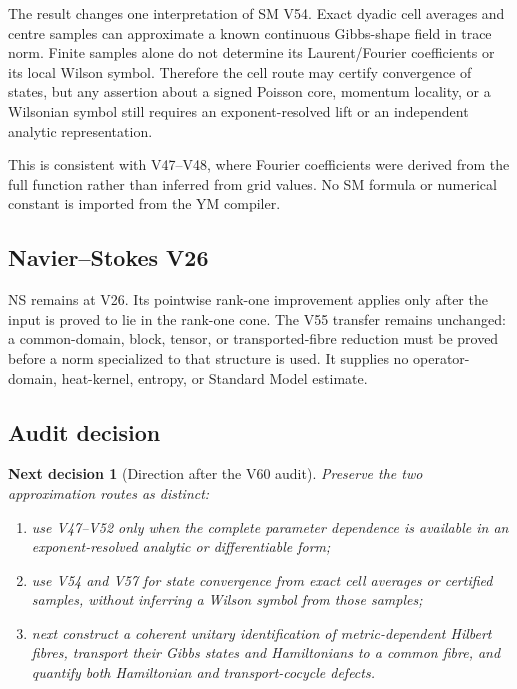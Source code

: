 \documentclass[11pt]{article}
\newtheorem{decision}[theorem]{Next decision}
\theoremstyle{remark}
\begin{document}
The result changes one interpretation of SM V54.  Exact dyadic cell
averages and centre samples can approximate a known continuous
Gibbs-shape field in trace norm.  Finite samples alone do not
determine its Laurent/Fourier coefficients or its local Wilson
symbol.  Therefore the cell route may certify convergence of states,
but any assertion about a signed Poisson core, momentum locality, or
a Wilsonian symbol still requires an exponent-resolved lift or an
independent analytic representation.

This is consistent with V47--V48, where Fourier coefficients were
derived from the full function rather than inferred from grid
values.  No SM formula or numerical constant is imported from the
YM compiler.

\subsection{Navier--Stokes V26}

NS remains at V26.  Its pointwise rank-one improvement applies only
after the input is proved to lie in the rank-one cone.  The V55
transfer remains unchanged: a common-domain, block, tensor, or
transported-fibre reduction must be proved before a norm specialized
to that structure is used.  It supplies no operator-domain,
heat-kernel, entropy, or Standard Model estimate.

\subsection{Audit decision}

\begin{decision}[Direction after the V60 audit]
\label{dec:v12v60-direction}
Preserve the two approximation routes as distinct:
\begin{enumerate}
\item use V47--V52 only when the complete parameter dependence is
available in an exponent-resolved analytic or differentiable form;
\item use V54 and V57 for state convergence from exact cell
averages or certified samples, without inferring a Wilson symbol
from those samples;
\item next construct a coherent unitary identification of
metric-dependent Hilbert fibres, transport their Gibbs states and
Hamiltonians to a common fibre, and quantify both Hamiltonian and
transport-cocycle defects.
\end{enumerate}
\end{decision}
\end{document}

